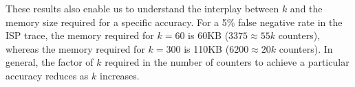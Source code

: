 These results also enable us to understand the interplay between $k$ and the
memory size required for a specific accuracy. For a 5\% false negative rate in the
ISP trace, the memory required for $k=60$ is 60KB ($3375 \approx 55k$ counters),
whereas the memory required for $k=300$ is 110KB ($6200 \approx 20k$ counters).
%
In general, the factor of $k$ required in the number of counters to
achieve a particular accuracy reduces as $k$ increases.



